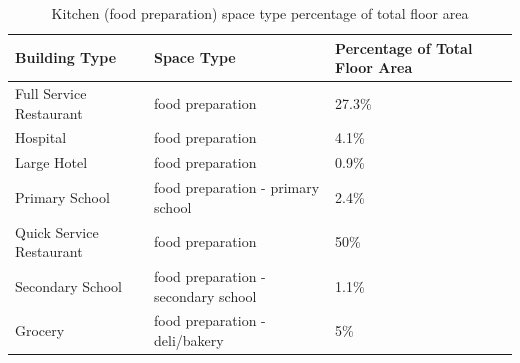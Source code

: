 \begin{table}[h!]
\small
\centering
\caption[Kitchen Space Type Percentage of Total Floor Area]{Kitchen (food preparation) space type percentage of total floor area}
\label{tab:kitchen_floor_area}
\begin{tabular}{|l|l|l|}
\hline
\textbf{Building Type} & \textbf{Space Type} & \textbf{Percentage of Total Floor Area} \\ \hline
Full Service Restaurant & food preparation & 27.3\% \\ \hline
Hospital & food preparation & 4.1\% \\ \hline
Large Hotel & food preparation & 0.9\% \\ \hline
Primary School & food preparation - primary school & 2.4\% \\ \hline
Quick Service Restaurant & food preparation & 50\% \\ \hline
Secondary School & food preparation - secondary school & 1.1\% \\ \hline
Grocery & food preparation - deli/bakery & 5\% \\ \hline
\end{tabular}
\end{table}
